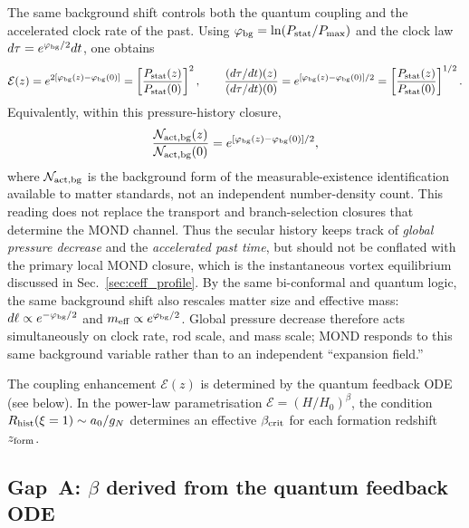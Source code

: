 \documentclass[11pt]{article}
\begin{document}
The same background shift controls both the quantum coupling and
the accelerated clock rate of the past.  Using
$\phi_{\rm bg}=\ln(P_{\rm stat}/P_{\max})$ and the clock law
$d\tau=e^{\phi_{\rm bg}/2}dt$, one obtains
\begin{equation}\label{eq:pressure_clock_ratio}
  \mathcal{E}(z)
  = e^{2[\phi_{\rm bg}(z)-\phi_{\rm bg}(0)]}
  = \left[\frac{P_{\rm stat}(z)}{P_{\rm stat}(0)}\right]^2,
  \qquad
  \frac{(d\tau/dt)(z)}{(d\tau/dt)(0)}
  = e^{[\phi_{\rm bg}(z)-\phi_{\rm bg}(0)]/2}
  = \left[\frac{P_{\rm stat}(z)}{P_{\rm stat}(0)}\right]^{1/2}.
\end{equation}
Equivalently, within this pressure-history closure,
\begin{equation}
  \frac{\mathcal N_{\rm act,bg}(z)}
       {\mathcal N_{\rm act,bg}(0)}
  =
  e^{[\phi_{\rm bg}(z)-\phi_{\rm bg}(0)]/2},
  \label{eq:Nact_bg_mond}
\end{equation}
where $\mathcal N_{\rm act,bg}$ is the background form of the
measurable-existence identification available to matter standards, not an
independent number-density count.  This reading does not replace the transport and
branch-selection closures that determine the MOND channel.
Thus the secular history keeps track of \emph{global pressure decrease}
and the \emph{accelerated past time}, but should not be conflated with
the primary local MOND closure, which is the instantaneous vortex
equilibrium discussed in Sec.~\ref{sec:ceff_profile}.
By the same bi-conformal and quantum logic, the same background shift
also rescales matter size and effective mass:
$d\ell\propto e^{-\phi_{\rm bg}/2}$ and
$m_{\rm eff}\propto e^{\phi_{\rm bg}/2}$.
Global pressure decrease therefore acts simultaneously on
clock rate, rod scale, and mass scale; MOND responds to this same
background variable rather than to an independent ``expansion field.''

The coupling enhancement $\mathcal{E}(z)$ is determined by
the quantum feedback ODE (see below).  In the power-law
parametrisation $\mathcal{E}=(H/H_0)^\beta$, the condition
$R_{\rm hist}(\xi=1)\sim a_0/g_N$ determines an effective
$\beta_{\rm crit}$ for each formation redshift $z_{\rm form}$.

\subsection[Gap A: beta derived from the quantum feedback ODE]{Gap~A: $\beta$ derived from the quantum feedback ODE}
\label{sec:gapA}
\end{document}
